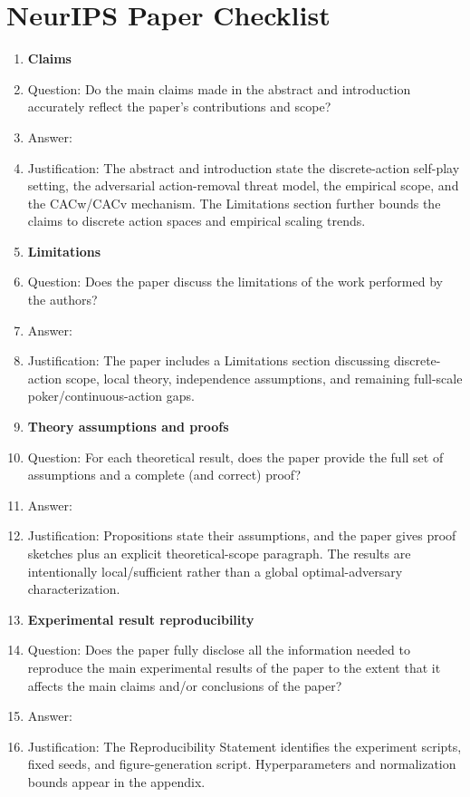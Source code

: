 \section*{NeurIPS Paper Checklist}

\begin{enumerate}

\item {\bf Claims}
    \item[] Question: Do the main claims made in the abstract and introduction accurately reflect the paper's contributions and scope?
    \item[] Answer: \answerYes{}
    \item[] Justification: The abstract and introduction state the discrete-action self-play setting, the adversarial action-removal threat model, the empirical scope, and the CACw/CACv mechanism. The Limitations section further bounds the claims to discrete action spaces and empirical scaling trends.

\item {\bf Limitations}
    \item[] Question: Does the paper discuss the limitations of the work performed by the authors?
    \item[] Answer: \answerYes{}
    \item[] Justification: The paper includes a Limitations section discussing discrete-action scope, local theory, independence assumptions, and remaining full-scale poker/continuous-action gaps.

\item {\bf Theory assumptions and proofs}
    \item[] Question: For each theoretical result, does the paper provide the full set of assumptions and a complete (and correct) proof?
    \item[] Answer: \answerYes{}
    \item[] Justification: Propositions state their assumptions, and the paper gives proof sketches plus an explicit theoretical-scope paragraph. The results are intentionally local/sufficient rather than a global optimal-adversary characterization.

\item {\bf Experimental result reproducibility}
    \item[] Question: Does the paper fully disclose all the information needed to reproduce the main experimental results of the paper to the extent that it affects the main claims and/or conclusions of the paper?
    \item[] Answer: \answerYes{}
    \item[] Justification: The Reproducibility Statement identifies the experiment scripts, fixed seeds, and figure-generation script. Hyperparameters and normalization bounds appear in the appendix.


\end{enumerate}
